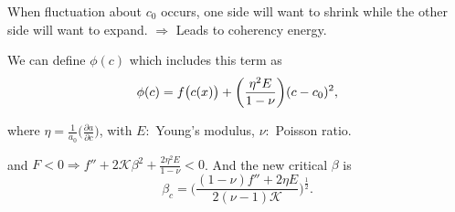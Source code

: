 \documentclass[12pt]{article}
\newcommand{\tikzmark}[1]{\tikz[overlay,remember picture] \node (#1) {};}
\begin{document}
When fluctuation about $c_0$ occurs, one side will want to shrink while
the other side will want to expand. $\Rightarrow$ Leads to coherency
energy.

We can define $\phi(c)$ which includes this term as
\begin{equation*}
 \phi(c) =
 \tikzmark{fcx}
 f\big(c(x)\big) +
 \bigg( \frac{ \eta^2 E }{ 1-\nu } \bigg) (c-c_0)^2,
\end{equation*}
\begin{figure}[h]
\end{figure}

\noindent
where $\eta = \frac{ 1 }{ a_0 } \Big( \frac{ \partial a }{ \partial c } \Big)$,
with $E\!:$ Young's modulus, $\nu\!:$ Poisson ratio.



\noindent
and $F < 0 \Rightarrow f'' + 2 \mathcal{K} \beta^2 + \frac{ 2\eta^2 E }{ 1-\nu } < 0$.
And the new critical $\beta$ is
\begin{equation*}
 \beta_c = \bigg( \frac{ (1-\nu)f''+2\eta E }{ 2 (\nu-1)\mathcal{K} } \bigg)^{\frac{ 1 }{ 2 }}.
\end{equation*}

\vspace{\baselineskip}

\end{document}
